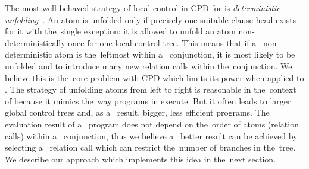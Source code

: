 The most well-behaved strategy of local control in CPD for \pro{} is \emph{deterministic unfolding}~\cite{leuschel1997advanced}.
An atom is unfolded only if precisely one suitable clause head exists for it with the~single exception: it is allowed to unfold an atom non-deterministically once for one local control tree.
This means that if a~ non-deterministic atom is the~leftmost within a~ conjunction, it is most likely to be unfolded and to introduce many new relation calls within the~conjunction.
We believe this is the~core problem with CPD which limits its power when applied to \mk{}.
The strategy of unfolding atoms from left to right is reasonable in the~context of \pro{} because it mimics the~way programs in \pro{} execute.
But it often leads to larger global control trees and, as a~ result, bigger, less efficient programs.
The evaluation result of a~ \mk{} program does not depend on the~order of atoms (relation calls) within a~ conjunction, thus we believe a~ better result can be achieved by selecting a~ relation call which can restrict the~number of branches in the~tree.
We describe our approach which implements this idea in the~next section.
